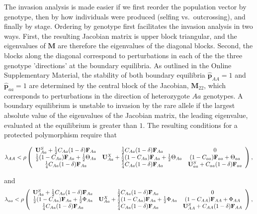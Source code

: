 \documentclass[11pt]{article}
\def\mbf#1{\mathbf{#1}}
\begin{document}
The invasion analysis is made easier if we first reorder the population vector by genotype, then by how individuals were produced (selfing vs.~outcrossing), and finally by stage. Ordering by genotype first facilitates the invasion analysis in two ways. First, the resulting Jacobian matrix is upper block triangular, and the eigenvalues of $\mbf{M}$ are therefore the eigenvalues of the diagonal blocks. Second, the blocks along the diagonal correspond to perturbations in each of the the three genotype 'directions' at the boundary equilibria. As outlined in the Online Supplementary Material, the stability of both boundary equilibria $\hat{\mbf{p}}_{AA} = 1$ and $\hat{\mbf{p}}_{aa} = 1$ are determined by the central block of the Jacobian, $\mbf{M}_{22}$, which corresponds to perturbations in the direction of heterozygote $Aa$ genotypes. A boundary equilibrium is unstable to invasion by the rare allele if the largest absolute value of the eigenvalues of the Jacobian matrix, the leading eigenvalue, evaluated at the equilibrium is greater than $1$. The resulting conditions for a protected polymorphism require that


{\footnotesize
\begin{equation} \label{eq:coexist_bigAA}
	\lambda_{AA} < 
			\rho\left(\begin{array}{ccc}
\mathbf{U}^S_{Aa} +\frac{1}{2} C_{Aa} (1 - \delta) \mbf{F}_{Aa} & \frac{1}{2} C_{Aa} (1 - \delta) \mbf{F}_{Aa}  & 0 \\
 \frac{1}{2} (1 - C_{Aa}) \mbf{F}_{Aa}+\frac{1}{2}  \Theta_{Aa} &\mathbf{U}^X_{Aa} + \frac{1}{2} (1 - C_{Aa}) \mbf{F}_{Aa} +\frac{1}{2}\Theta_{Aa} & (1-C_{aa})\mbf{F}_{aa} + \Theta_{aa}\\
  \frac{1}{4} C_{Aa} (1 - \delta) \mbf{F}_{Aa} & \frac{1}{4} C_{Aa} (1 - \delta) \mbf{F}_{Aa}  &\mathbf{U}^S_{aa} +C_{aa} (1 - \delta) \mbf{F}_{aa}  \\ 
			\end{array} \right), \\ 
\end{equation} 

\noindent and
\begin{equation} \label{eq:coexist_aa}
	\lambda_{aa} < 
			\rho\left(\begin{array}{ccc}
\mathbf{U}^S_{Aa} +\frac{1}{2} C_{Aa} (1 - \delta) \mbf{F}_{Aa} & \frac{1}{2} C_{Aa} (1 - \delta) \mbf{F}_{Aa}  & 0 \\
 \frac{1}{2} (1 - C_{Aa}) \mbf{F}_{Aa}+\frac{1}{2 } \Phi_{Aa} &\mathbf{U}^X_{Aa} + \frac{1}{2} (1 - C_{Aa}) \mbf{F}_{Aa} +\frac{1}{2} \Phi_{Aa} & (1-C_{AA})\mbf{F}_{AA} + \Phi_{AA}\\
  \frac{1}{4} C_{Aa} (1 - \delta) \mbf{F}_{Aa} & \frac{1}{4} C_{Aa} (1 - \delta) \mbf{F}_{Aa}  &\mathbf{U}^S_{AA} + C_{AA} (1 - \delta) \mbf{F}_{AA}  \\ 
			\end{array} \right), \\ 
\end{equation} 
}
\end{document}
